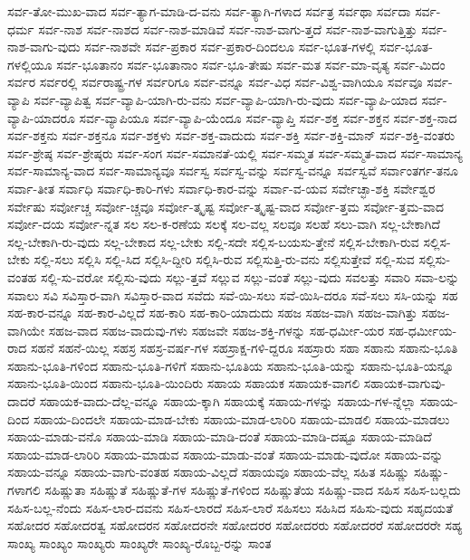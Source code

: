 {ಸರ್ವ-ತೋ-ಮುಖ-ವಾದ
ಸರ್ವ-ತ್ಯಾಗ-ಮಾಡಿ-ದ-ವನು
ಸರ್ವ-ತ್ಯಾಗಿ-ಗಳಾದ
ಸರ್ವತ್ರ
ಸರ್ವಥಾ
ಸರ್ವದಾ
ಸರ್ವ-ಧರ್ಮ
ಸರ್ವ-ನಾಶ
ಸರ್ವ-ನಾಶದ
ಸರ್ವ-ನಾಶ-ಮಾಡಿವೆ
ಸರ್ವ-ನಾಶ-ವಾಗು-ತ್ತದೆ
ಸರ್ವ-ನಾಶ-ವಾಗುತ್ತಿತ್ತು
ಸರ್ವ-ನಾಶ-ವಾಗು-ವುದು
ಸರ್ವ-ನಾಶವೇ
ಸರ್ವ-ಪ್ರಕಾರ
ಸರ್ವ-ಪ್ರಕಾರ-ದಿಂದಲೂ
ಸರ್ವ-ಭೂತ-ಗಳಲ್ಲಿ
ಸರ್ವ-ಭೂತ-ಗಳಲ್ಲಿಯೂ
ಸರ್ವ-ಭೂತಾನಂ
ಸರ್ವ-ಭೂತಾನಾಂ
ಸರ್ವ-ಭೂ-ತೇಷು
ಸರ್ವ-ಮತ
ಸರ್ವ-ಮಾ-ವೃತ್ಯ
ಸರ್ವ-ಮಿದಂ
ಸರ್ವರ
ಸರ್ವರಲ್ಲಿ
ಸರ್ವರಾಷ್ಟ್ರ-ಗಳ
ಸರ್ವರಿಗೂ
ಸರ್ವ-ವನ್ನೂ
ಸರ್ವ-ವಿಧ
ಸರ್ವ-ವಿಶ್ವ-ವಾಗಿಯೂ
ಸರ್ವವೂ
ಸರ್ವ-ವ್ಯಾಪಿ
ಸರ್ವ-ವ್ಯಾಪಿತ್ವ
ಸರ್ವ-ವ್ಯಾಪಿ-ಯಾಗಿ-ರು-ವನು
ಸರ್ವ-ವ್ಯಾಪಿ-ಯಾಗಿ-ರು-ವುದು
ಸರ್ವ-ವ್ಯಾಪಿ-ಯಾದ
ಸರ್ವ-ವ್ಯಾಪಿ-ಯಾದರೂ
ಸರ್ವ-ವ್ಯಾಪಿಯೂ
ಸರ್ವ-ವ್ಯಾಪಿ-ಯೆಂದೂ
ಸರ್ವ-ವ್ಯಾಪ್ತಿ
ಸರ್ವ-ಶಕ್ತ
ಸರ್ವ-ಶಕ್ತನ
ಸರ್ವ-ಶಕ್ತ-ನಾದ
ಸರ್ವ-ಶಕ್ತನು
ಸರ್ವ-ಶಕ್ತನೂ
ಸರ್ವ-ಶಕ್ತಳು
ಸರ್ವ-ಶಕ್ತ-ವಾದುದು
ಸರ್ವ-ಶಕ್ತಿ
ಸರ್ವ-ಶಕ್ತಿ-ಮಾನ್
ಸರ್ವ-ಶಕ್ತಿ-ವಂತರು
ಸರ್ವ-ಶ್ರೇಷ್ಠ
ಸರ್ವ-ಶ್ರೇಷ್ಠರು
ಸರ್ವ-ಸಂಗ
ಸರ್ವ-ಸಮಾನತೆ-ಯಲ್ಲಿ
ಸರ್ವ-ಸಮ್ಮತ
ಸರ್ವ-ಸಮ್ಮತ-ವಾದ
ಸರ್ವ-ಸಾಮಾನ್ಯ
ಸರ್ವ-ಸಾಮಾನ್ಯ-ವಾದ
ಸರ್ವ-ಸಾಮಾನ್ಯವೂ
ಸರ್ವಸ್ವ
ಸರ್ವಸ್ವ-ವನ್ನು
ಸರ್ವಸ್ವ-ವನ್ನೂ
ಸರ್ವಸ್ವವೆ
ಸರ್ವಾಂತರ್ಗ-ತನೂ
ಸರ್ವಾ-ತೀತ
ಸರ್ವಾಧಿ
ಸರ್ವಾಧಿ-ಕಾರಿ-ಗಳು
ಸರ್ವಾಧಿ-ಕಾರ-ವನ್ನು
ಸರ್ವಾ-ವ-ಯವ
ಸರ್ವೇಚ್ಛಾ-ಶಕ್ತಿ
ಸರ್ವೇಶ್ವರ
ಸರ್ವೇಷು
ಸರ್ವೋಚ್ಚ
ಸರ್ವೋ-ಚ್ಚವೂ
ಸರ್ವೋ-ತ್ಕೃಷ್ಟ
ಸರ್ವೋ-ತ್ಕೃಷ್ಟ-ವಾದ
ಸರ್ವೋ-ತ್ತಮ
ಸರ್ವೋ-ತ್ತಮ-ವಾದ
ಸರ್ವೋ-ದಯ
ಸರ್ವೋ-ನ್ನತ
ಸಲ
ಸಲ-ಕ-ರಣೆಯ
ಸಲಕ್ಕೆ
ಸಲ-ವಲ್ಲ
ಸಲವೂ
ಸಲಹೆ
ಸಲು-ವಾಗಿ
ಸಲ್ಲ-ಬೇಕಾಗಿದೆ
ಸಲ್ಲ-ಬೇಕಾಗಿ-ರು-ವುದು
ಸಲ್ಲ-ಬೇಕಾದ
ಸಲ್ಲ-ಬೇಕು
ಸಲ್ಲಿ-ಸದೇ
ಸಲ್ಲಿಸ-ಬಯಸು-ತ್ತೇನೆ
ಸಲ್ಲಿಸ-ಬೇಕಾಗಿ-ರುವ
ಸಲ್ಲಿಸ-ಬೇಕು
ಸಲ್ಲಿ-ಸಲು
ಸಲ್ಲಿಸಿ
ಸಲ್ಲಿ-ಸಿದ
ಸಲ್ಲಿಸಿ-ದ್ದೀರಿ
ಸಲ್ಲಿಸಿ-ರುವ
ಸಲ್ಲಿಸುತ್ತಿ-ರು-ವನು
ಸಲ್ಲಿಸುತ್ತೇವೆ
ಸಲ್ಲಿ-ಸುವ
ಸಲ್ಲಿಸು-ವಂತಹ
ಸಲ್ಲಿ-ಸು-ವರೋ
ಸಲ್ಲಿಸು-ವುದು
ಸಲ್ಲು-ತ್ತವೆ
ಸಲ್ಲುವ
ಸಲ್ಲು-ವಂತೆ
ಸಲ್ಲು-ವುದು
ಸವಲತ್ತು
ಸವಾರಿ
ಸವಾ-ಲನ್ನು
ಸವಾಲು
ಸವಿ
ಸವಿಸ್ತಾರ-ವಾಗಿ
ಸವಿಸ್ತಾರ-ವಾದ
ಸವೆದು
ಸವೆ-ಯಿ-ಸಲು
ಸವೆ-ಯಿಸಿ-ದರೂ
ಸವೆ-ಸಲು
ಸಸಿ-ಯನ್ನು
ಸಹ
ಸಹ-ಕಾರ-ವನ್ನೂ
ಸಹ-ಕಾರ-ವಿಲ್ಲದೆ
ಸಹ-ಕಾರಿ
ಸಹ-ಕಾರಿ-ಯಾದುದು
ಸಹಜ
ಸಹಜ-ವಾಗಿ
ಸಹಜ-ವಾಗಿತ್ತು
ಸಹಜ-ವಾಗಿಯೇ
ಸಹಜ-ವಾದ
ಸಹಜ-ವಾದುವು-ಗಳು
ಸಹಜವೇ
ಸಹಜ-ಶಕ್ತಿ-ಗಳನ್ನು
ಸಹ-ಧರ್ಮೀ-ಯರ
ಸಹ-ಧರ್ಮೀಯ-ರಾದ
ಸಹನೆ
ಸಹನೆ-ಯಿಲ್ಲ
ಸಹಸ್ರ
ಸಹಸ್ರ-ವರ್ಷ-ಗಳ
ಸಹಸ್ರಾಕ್ಷ-ಗಳಿ-ದ್ದರೂ
ಸಹಸ್ರಾರು
ಸಹಾ
ಸಹಾನು
ಸಹಾನು-ಭೂತಿ
ಸಹಾನು-ಭೂತಿ-ಗಳಿಂದ
ಸಹಾನು-ಭೂತಿ-ಗಳಿಗೆ
ಸಹಾನು-ಭೂತಿಯ
ಸಹಾನು-ಭೂತಿ-ಯನ್ನು
ಸಹಾನು-ಭೂತಿ-ಯನ್ನೂ
ಸಹಾನು-ಭೂತಿ-ಯಿಂದ
ಸಹಾನು-ಭೂತಿ-ಯಿಂದಿರು
ಸಹಾಯ
ಸಹಾಯಕ
ಸಹಾಯಕ-ವಾಗಲಿ
ಸಹಾಯಕ-ವಾಗುವು-ದಾದರೆ
ಸಹಾಯಕ-ವಾದು-ದೆಲ್ಲ-ವನ್ನೂ
ಸಹಾಯ-ಕ್ಕಾಗಿ
ಸಹಾಯಕ್ಕೆ
ಸಹಾಯ-ಗಳನ್ನು
ಸಹಾಯ-ಗಳ-ನ್ನೆಲ್ಲಾ
ಸಹಾಯ-ದಿಂದ
ಸಹಾಯ-ದಿಂದಲೇ
ಸಹಾಯ-ಮಾಡ-ಬೇಕು
ಸಹಾಯ-ಮಾಡ-ಲಾರಿರಿ
ಸಹಾಯ-ಮಾಡಲಿ
ಸಹಾಯ-ಮಾಡಲು
ಸಹಾಯ-ಮಾಡು-ವನೊ
ಸಹಾಯ-ಮಾಡಿ
ಸಹಾಯ-ಮಾಡಿ-ದಂತೆ
ಸಹಾಯ-ಮಾಡಿ-ದಷ್ಟೂ
ಸಹಾಯ-ಮಾಡಿದೆ
ಸಹಾಯ-ಮಾಡ-ಲಾರಿರಿ
ಸಹಾಯ-ಮಾಡುವ
ಸಹಾಯ-ಮಾಡು-ವಂತೆ
ಸಹಾಯ-ಮಾಡು-ವುದೋ
ಸಹಾಯ-ವನ್ನು
ಸಹಾಯ-ವನ್ನೂ
ಸಹಾಯ-ವಾಗು-ವಂತಹ
ಸಹಾಯ-ವಿಲ್ಲದೆ
ಸಹಾಯವೂ
ಸಹಾಯ-ವೆಲ್ಲ
ಸಹಿತ
ಸಹಿಷ್ಣು
ಸಹಿಷ್ಣು-ಗಳಾಗಲಿ
ಸಹಿಷ್ಣುತಾ
ಸಹಿಷ್ಣುತೆ
ಸಹಿಷ್ಣುತೆ-ಗಳ
ಸಹಿಷ್ಣುತೆ-ಗಳಿಂದ
ಸಹಿಷ್ಣುತೆಯ
ಸಹಿಷ್ಣು-ವಾದ
ಸಹಿಸ
ಸಹಿಸ-ಬಲ್ಲದು
ಸಹಿಸ-ಬಲ್ಲ-ನೆಂದು
ಸಹಿಸ-ಲಾರ-ದವನು
ಸಹಿಸ-ಲಾರದೆ
ಸಹಿಸ-ಲಾರೆ
ಸಹಿಸಲು
ಸಹಿಸಿದ
ಸಹಿಸು-ವುದು
ಸಹೃದಯತೆ
ಸಹೋದರ
ಸಹೋದರತ್ವ
ಸಹೋದರನ
ಸಹೋದರನೇ
ಸಹೋದರರ
ಸಹೋದರರು
ಸಹೋದರರೆ
ಸಹೋದರರೇ
ಸಹ್ಯ
ಸಾಂಖ್ಯ
ಸಾಂಖ್ಯಂ
ಸಾಂಖ್ಯರು
ಸಾಂಖ್ಯರೇ
ಸಾಂಖ್ಯ-ರೊಬ್ಬ-ರನ್ನು
ಸಾಂತ
}
